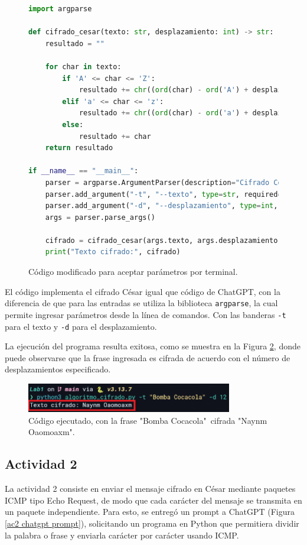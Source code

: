 \documentclass[letter,12pt]{article}
\begin{document}
\begin{figure}[H]
    \centering
    \begin{lstlisting}[language=Python]
import argparse

def cifrado_cesar(texto: str, desplazamiento: int) -> str:
    resultado = ""

    for char in texto:
        if 'A' <= char <= 'Z':
            resultado += chr((ord(char) - ord('A') + desplazamiento) % 26 + ord('A'))
        elif 'a' <= char <= 'z':
            resultado += chr((ord(char) - ord('a') + desplazamiento) % 26 + ord('a'))
        else:
            resultado += char
    return resultado

if __name__ == "__main__":
    parser = argparse.ArgumentParser(description="Cifrado Cesar")
    parser.add_argument("-t", "--texto", type=str, required=True, help="Texto a cifrar")
    parser.add_argument("-d", "--desplazamiento", type=int, required=True, help="Desplazamiento Cesar")
    args = parser.parse_args()

    cifrado = cifrado_cesar(args.texto, args.desplazamiento)
    print("Texto cifrado:", cifrado)
    \end{lstlisting}
    \caption{Código modificado para aceptar parámetros por terminal.}
    \label{ac1 codigo modificado}
\end{figure}  

El código implementa el cifrado César igual que código de ChatGPT, con la diferencia de que para las entradas se utiliza la biblioteca \verb|argparse|, la cual permite ingresar parámetros desde la línea de comandos. Con las banderas \verb|-t| para el texto y \verb|-d| para el desplazamiento.

La ejecución del programa resulta exitosa, como se muestra en la Figura \ref{ac1 codigo ejecutado}, donde puede observarse que la frase ingresada es cifrada de acuerdo con el número de desplazamientos especificado.

\begin{figure}[H]
    \centering
    \includegraphics[width=9cm]{actividades/ac1/codigo_ejecutado.png}
    \caption{Código ejecutado, con la frase "Bomba Cocacola"\ cifrada "Naynm Oaomoaxm".}
    \label{ac1 codigo ejecutado}
\end{figure}

\subsection{Actividad 2}
\label{actividad 2 respuesta}
La actividad 2 consiste en enviar el mensaje cifrado en César mediante paquetes ICMP tipo Echo Request, de modo que cada carácter del mensaje se transmita en un paquete independiente. Para esto, se entregó un prompt a ChatGPT (Figura \ref{ac2 chatgpt prompt}), solicitando un programa en Python que permitiera dividir la palabra o frase y enviarla carácter por carácter usando ICMP.
\end{document}
